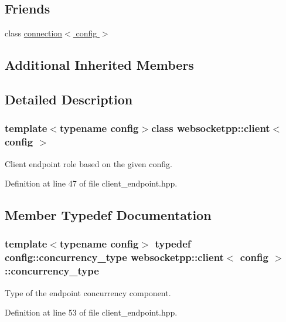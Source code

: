 \subsection*{Friends}
\begin{DoxyCompactItemize}
\item 
class \hyperlink{classwebsocketpp_1_1client_a408f6796a357de56c73c3beb2f13c61d}{connection$<$ config $>$}
\end{DoxyCompactItemize}
\subsection*{Additional Inherited Members}


\subsection{Detailed Description}
\subsubsection*{template$<$typename config$>$class websocketpp\+::client$<$ config $>$}

Client endpoint role based on the given config. 

Definition at line 47 of file client\+\_\+endpoint.\+hpp.



\subsection{Member Typedef Documentation}
\hypertarget{classwebsocketpp_1_1client_a404ec215508a5553d3a2295fdd82977e}{}
\subsubsection[{concurrency\+\_\+type}]{\setlength{\rightskip}{0pt plus 5cm}template$<$typename config$>$ typedef config\+::concurrency\+\_\+type {\bf websocketpp\+::client}$<$ config $>$\+::{\bf concurrency\+\_\+type}}\label{classwebsocketpp_1_1client_a404ec215508a5553d3a2295fdd82977e}


Type of the endpoint concurrency component. 



Definition at line 53 of file client\+\_\+endpoint.\+hpp.

